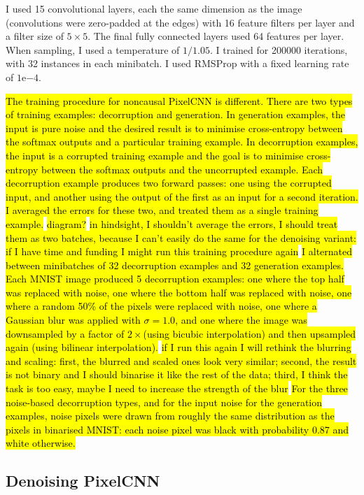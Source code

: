 \documentclass[10pt,a4paper]{article}
\begin{document}
I used 15 convolutional layers, each the same dimension as the image (convolutions were zero-padded at the edges) with 16 feature filters per layer and a filter size of $5\times 5$. The final fully connected layers used 64 features per layer. When sampling, I used a temperature of $1/1.05$. I trained for 200000 iterations, with 32 instances in each minibatch. I used RMSProp with a fixed learning rate of $1\mathrm{e}{-4}$.

\hl{The training procedure for noncausal PixelCNN is different. There are two types of training examples: decorruption and generation. In generation examples, the input is pure noise and the desired result is to minimise cross-entropy between the softmax outputs and a particular training example. In decorruption examples, the input is a corrupted training example and the goal is to minimise cross-entropy between the softmax outputs and the uncorrupted example. Each decorruption example produces two forward passes: one using the corrupted input, and another using the output of the first as an input for a second iteration. I averaged the errors for these two, and treated them as a single training example.} \hl{diagram?} \hl{in hindsight, I shouldn't average the errors, I should treat them as two batches, because I can't easily do the same for the denoising variant: if I have time and funding I might run this training procedure again} \hl{I alternated between minibatches of 32 decorruption examples and 32 generation examples. Each MNIST image produced 5 decorruption examples: one where the top half was replaced with noise, one where the bottom half was replaced with noise, one where a random 50\% of the pixels were replaced with noise, one where a Gaussian blur was applied with $\sigma=1.0$, and one where the image was downsampled by a factor of $2\times$(using bicubic interpolation) and then upsampled again (using bilinear interpolation).} \hl{if I run this again I will rethink the blurring and scaling: first, the blurred and scaled ones look very similar; second, the result is not binary and I should binarise it like the rest of the data; third, I think the task is too easy, maybe I need to increase the strength of the blur} \hl{For the three noise-based decorruption types, and for the input noise for the generation examples, noise pixels were drawn from roughly the same distribution as the pixels in binarised MNIST: each noise pixel was black with probability 0.87 and white otherwise.}

\subsection{Denoising PixelCNN}
\end{document}
